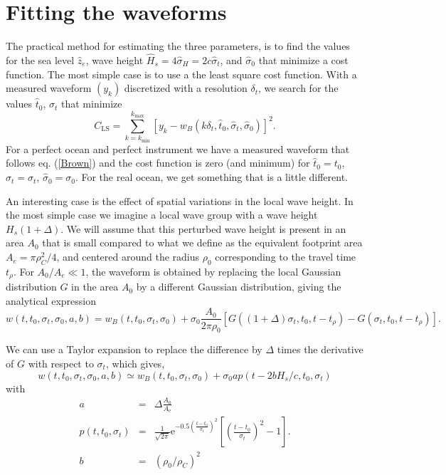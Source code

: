 \section{Fitting the waveforms}

The practical method for estimating the three parameters, is to find the values for the sea level $\widehat{z}_e$, wave height $\widehat{H}_s=4 \widehat{\sigma}_H= 2 c \widehat{\sigma}_t$, and $\widehat{\sigma}_0$ that minimize a cost function. The most simple case is to use a the least square cost 
function. With a measured waveform $(y_k)$ discretized with a resolution $\delta_t$, we search for the values  $\widehat{t}_0$, $\widehat{\sigma}_t$ that minimize 
\begin{equation} 
    C_{\mathrm{LS}}=\sum_{k=k_{\min}}^{k_{\max}}  \left[ y_k - w_B(k \delta_t,\widehat{t}_0,\widehat{\sigma}_t,\widehat{\sigma}_0) \right]^2. \label{eq_CLS}
\end{equation}
For a perfect ocean and perfect instrument we have a measured waveform that follows eq. (\ref{Brown}) and the cost function is zero (and minimum) for 
$\widehat{t}_0=t_0$, $\widehat{\sigma}_t=\sigma_t$, $\widehat{\sigma}_0=\sigma_0$. For the real ocean, we get something that is a little different. 

An interesting case is the effect of spatial variations in the local wave height. In the most simple case we imagine a local wave group with a wave height $H_s(1+\Delta)$. We will assume that this perturbed wave height is present in an area $A_0$ that is small compared to what we define as the equivalent footprint area $A_e= \pi \rho_C^2/4$, and centered around the radius $\rho_0$ corresponding to the travel time $t_\rho$. For $A_0/A_e \ll 1$, the waveform is obtained by replacing the local Gaussian distribution $G$ in the area $A_0$ by a different Gaussian distribution, giving the analytical expression 
\begin{equation}
    w(t,t_0,\sigma_t,\sigma_0,a,b)=  w_B(t,t_0,\sigma_t,\sigma_0) + \sigma_0 \frac{A_0}{2 \pi \rho_0} \left[ G((1+\Delta)\sigma_t,t_0,t-t_\rho)- G(\sigma_t,t_0,t-t_\rho)  \right].
\end{equation}

We can use a Taylor expansion to replace the difference by $\Delta$ times the derivative of $G$ with respect to $\sigma_t$, which gives, 
\begin{equation}
    w(t,t_0,\sigma_t,\sigma_0,a,b) \simeq  w_B(t,t_0,\sigma_t,\sigma_0) + \sigma_0 a p(t-2 b H_s/c,t_0,\sigma_t)
\end{equation} 
with 
\begin{eqnarray}
        a&=&\Delta \frac{A_0}{A_{\mathrm{e}}} \label{eq:alti_a} \\ 
    p(t,t_0,\sigma_t) &=& \frac{1}{\sqrt{2\pi}} \mathrm{e}^{-0.5 \left(\frac{t-t_0}{\sigma_t} \right)^2 } \left[\left(\frac{t-t_0}{\sigma_t} \right)^2-1\right]. \label{eq:p_alti} \\
        b&=& \left(\rho_0/\rho_C \right)^2
\end{eqnarray} 

